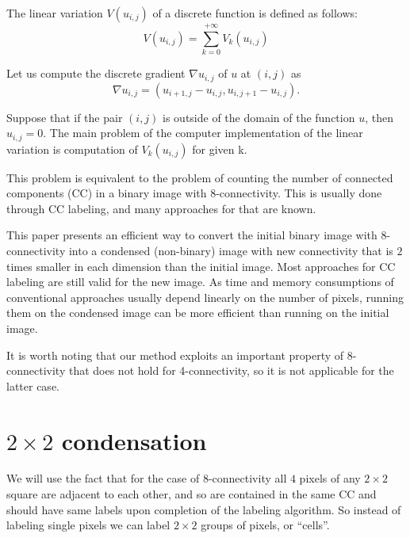 \documentclass{llncs}
\begin{document}
\begin{definition}
  The linear variation $V(u_{i,j})$ of a discrete function  is defined as follows:
  \begin{equation}
    V(u_{i,j}) = \sum_{k=0}^{+\infty} V_k(u_{i,j})
    \label{eq:V}
  \end{equation}
\end{definition}

Let us compute the discrete gradient $\nabla u_{i,j}$ of $u$ at $(i,j)$ as
\begin{equation}
  \nabla u_{i,j} = (u_{i+1,j} - u_{i,j}, u_{i,j+1} - u_{i,j}).
  \label{eq:gradient}
\end{equation}

Suppose that if the pair $(i,j)$ is outside of the domain of the function $u$, then 
$u_{i,j} = 0$.
The main problem of the computer implementation of the linear variation is 
computation of $V_k(u_{i,j})$ for given k.


This problem is equivalent to the problem of counting the number of connected
components (CC) in a binary image with 8-connectivity.
This is usually done through CC labeling, and many approaches for that are
known\cite{sterzh}.

This paper presents an efficient way to convert the initial binary image
with 8-connectivity into
a condensed (non-binary) image with new connectivity that is $2$ times smaller in
each dimension than the initial image.
Most approaches for CC labeling are still valid for the new image.
As time and memory consumptions of conventional approaches usually depend linearly on
the number of pixels, running them on the condensed image can be
more efficient than running on the initial image.

It is worth noting that our method exploits an important property of 8-connectivity
that does not hold for 4-connectivity, so it is not applicable for the latter case.

\section{$2\times2$ condensation}

We will use the fact that for the case of 8-connectivity all $4$ pixels of any
$2 \times 2$ square are adjacent to each other, and so are contained in the same CC
and should have same labels upon completion of the labeling algorithm.
So instead of labeling single pixels we can label $2 \times 2$ groups of pixels,
or ``cells''.
\end{document}
